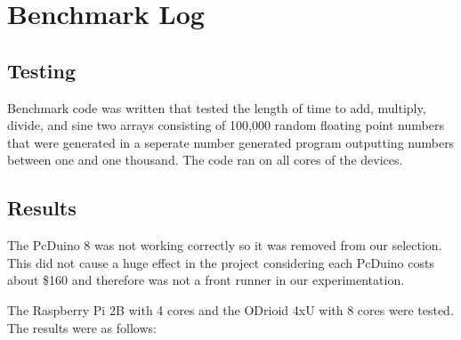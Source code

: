 \documentclass{article}
\begin{document}
\section*{Benchmark Log}
\subsection*{Testing}
Benchmark code was written that tested the length of time to add, multiply, divide, and sine two arrays consisting of 100,000 random floating point numbers that were generated in a seperate number generated program outputting numbers between one and one thousand. The code ran on all cores of the devices.

\subsection*{Results}
The PcDuino 8 was not working correctly so it was removed from our selection. This did not cause a huge effect in the project considering each PcDuino costs about \$160 and therefore was not a front runner in our experimentation.\newline

The Raspberry Pi 2B with 4 cores and the ODrioid 4xU with 8 cores were tested. The results were as follows:
\end{document}
